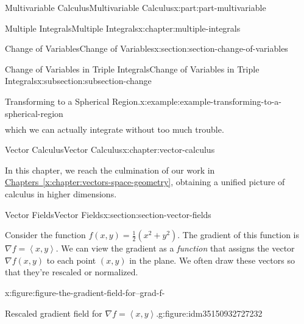 \documentclass[twoside,10pt,]{tufte-book}
\newcommand{\xreffont}{\relax}
\numberwithin{equation}{part}
\newcommand{\grad}{\nabla}
\newcommand{\dotprod}[1]{\left\langle #1 \right\rangle}
\begin{document}
\begin{partptx}{Multivariable Calculus}{}{Multivariable Calculus}{}{}{x:part:part-multivariable}
\begin{chapterptx}{Multiple Integrals}{}{Multiple Integrals}{}{}{x:chapter:multiple-integrals}
\begin{sectionptx}{Change of Variables}{}{Change of Variables}{}{}{x:section:section-change-of-variables}
\begin{subsectionptx}{Change of Variables in Triple Integrals}{}{Change of Variables in Triple Integrals}{}{}{x:subsection:subsection-change}
\begin{example}{Transforming to a Spherical Region.}{x:example:example-transforming-to-a-spherical-region}
\begin{align*}
\end{align*}
which we can actually integrate without too much trouble.%
\end{example}
\end{subsectionptx}
\end{sectionptx}
\end{chapterptx}
%
\typeout{************************************************}
\typeout{************************************************}
%
\begin{chapterptx}{Vector Calculus}{}{Vector Calculus}{}{}{x:chapter:vector-calculus}
\begin{introduction}{}%
In this chapter, we reach the culmination of our work in \hyperref[x:chapter:vectors-space-geometry]{Chapters~{\xreffont\ref{x:chapter:vectors-space-geometry}}\textendash{}{\xreffont\ref{x:chapter:multiple-integrals}}}, obtaining a unified picture of calculus in higher dimensions.%
\end{introduction}%
%
%
\typeout{************************************************}
\typeout{************************************************}
%
\begin{sectionptx}{Vector Fields}{}{Vector Fields}{}{}{x:section:section-vector-fields}
\begin{introduction}{}%
Consider the function \(f(x,y) = \frac{1}{2}(x^{2} + y^{2})\). The gradient of this function is \(\grad f = \dotprod{x,y}\). We can view the gradient as a \emph{function} that assigns the vector \(\grad f(x,y)\) to each point \((x,y)\) in the plane. We often draw these vectors so that they're rescaled or normalized. \begin{figureptx}{}{x:figure:figure-the-gradient-field-for--grad-f-}{}%
\begin{sidebyside}{2}{0}{0}{0}%
\begin{sbspanel}{0.5}%
\begin{subfigureptx}{Rescaled gradient field for \(\grad f = \dotprod{x,y}\).}{g:figure:idm35150932727232}{}%

\end{subfigureptx}
\end{sbspanel}
\end{sidebyside}
\end{figureptx}
\end{introduction}
\end{sectionptx}
\end{chapterptx}
\end{partptx}
\end{document}
